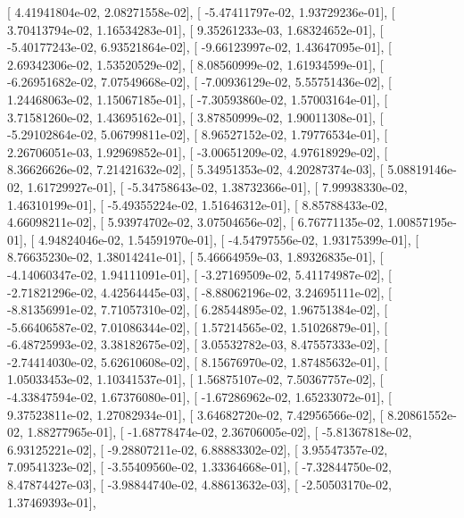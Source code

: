 \documentclass{article}
\begin{document}
       [  4.41941804e-02,   2.08271558e-02],
       [ -5.47411797e-02,   1.93729236e-01],
       [  3.70413794e-02,   1.16534283e-01],
       [  9.35261233e-03,   1.68324652e-01],
       [ -5.40177243e-02,   6.93521864e-02],
       [ -9.66123997e-02,   1.43647095e-01],
       [  2.69342306e-02,   1.53520529e-02],
       [  8.08560999e-02,   1.61934599e-01],
       [ -6.26951682e-02,   7.07549668e-02],
       [ -7.00936129e-02,   5.55751436e-02],
       [  1.24468063e-02,   1.15067185e-01],
       [ -7.30593860e-02,   1.57003164e-01],
       [  3.71581260e-02,   1.43695162e-01],
       [  3.87850999e-02,   1.90011308e-01],
       [ -5.29102864e-02,   5.06799811e-02],
       [  8.96527152e-02,   1.79776534e-01],
       [  2.26706051e-03,   1.92969852e-01],
       [ -3.00651209e-02,   4.97618929e-02],
       [  8.36626626e-02,   7.21421632e-02],
       [  5.34951353e-02,   4.20287374e-03],
       [  5.08819146e-02,   1.61729927e-01],
       [ -5.34758643e-02,   1.38732366e-01],
       [  7.99938330e-02,   1.46310199e-01],
       [ -5.49355224e-02,   1.51646312e-01],
       [  8.85788433e-02,   4.66098211e-02],
       [  5.93974702e-02,   3.07504656e-02],
       [  6.76771135e-02,   1.00857195e-01],
       [  4.94824046e-02,   1.54591970e-01],
       [ -4.54797556e-02,   1.93175399e-01],
       [  8.76635230e-02,   1.38014241e-01],
       [  5.46664959e-03,   1.89326835e-01],
       [ -4.14060347e-02,   1.94111091e-01],
       [ -3.27169509e-02,   5.41174987e-02],
       [ -2.71821296e-02,   4.42564445e-03],
       [ -8.88062196e-02,   3.24695111e-02],
       [ -8.81356991e-02,   7.71057310e-02],
       [  6.28544895e-02,   1.96751384e-02],
       [ -5.66406587e-02,   7.01086344e-02],
       [  1.57214565e-02,   1.51026879e-01],
       [ -6.48725993e-02,   3.38182675e-02],
       [  3.05532782e-03,   8.47557333e-02],
       [ -2.74414030e-02,   5.62610608e-02],
       [  8.15676970e-02,   1.87485632e-01],
       [  1.05033453e-02,   1.10341537e-01],
       [  1.56875107e-02,   7.50367757e-02],
       [ -4.33847594e-02,   1.67376080e-01],
       [ -1.67286962e-02,   1.65233072e-01],
       [  9.37523811e-02,   1.27082934e-01],
       [  3.64682720e-02,   7.42956566e-02],
       [  8.20861552e-02,   1.88277965e-01],
       [ -1.68778474e-02,   2.36706005e-02],
       [ -5.81367818e-02,   6.93125221e-02],
       [ -9.28807211e-02,   6.88883302e-02],
       [  3.95547357e-02,   7.09541323e-02],
       [ -3.55409560e-02,   1.33364668e-01],
       [ -7.32844750e-02,   8.47874427e-03],
       [ -3.98844740e-02,   4.88613632e-03],
       [ -2.50503170e-02,   1.37469393e-01],
\end{document}
